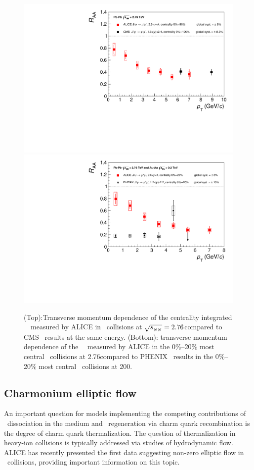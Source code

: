\begin{figure}[h!]
\begin{center}
\includegraphics[width=0.49\linewidth,keepaspectratio]{qqbarfigures/RAAPtvsModels1.pdf}
\includegraphics[width=0.49\linewidth,keepaspectratio]{qqbarfigures/RAAPtvsModels2.pdf}
\caption{ \label{fig:GR:raaexp2}
(Top):Transverse momentum dependence of the centrality integrated \jpsi\ \Raa\ measured by ALICE in \PbPb\ collisions at $\sqrt{s_{_{NN}}} = 2.76$\TeV compared to CMS~\cite{Chatrchyan:2012np} results at the same energy.
(Bottom): transverse momentum dependence of the \jpsi\ \Raa\ measured by ALICE in the 0\%--20\% most central \PbPb\ collisions at 2.76\TeV compared to PHENIX~\cite{Adare:2011yf} results in the 0\%--20\% most central \AuAu\ collisions at 200\GeV.}
\end{center}
\end{figure}


\subsection{Charmonium elliptic flow}

An important question for models implementing the competing contributions of 
\jpsi\ dissociation in the medium and \jpsi\ regeneration via charm quark recombination is 
the degree of charm quark thermalization. The question of thermalization in heavy-ion collisions is typically addressed
via studies of hydrodynamic flow. ALICE has recently presented the first data suggesting non-zero elliptic flow
in \PbPb\ collisions, providing important information on this topic.

